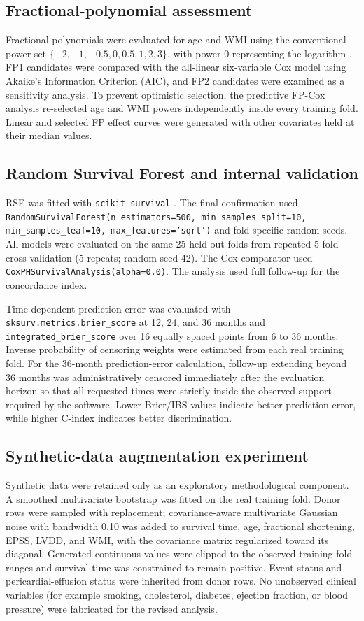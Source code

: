 \documentclass[a4paper,12pt]{article}
\begin{document}
\subsection{Fractional-polynomial assessment}
Fractional polynomials were evaluated for age and WMI using the conventional power set $\{-2,-1,-0.5,0,0.5,1,2,3\}$, with power 0 representing the logarithm \cite{ref10,ref36}. FP1 candidates were compared with the all-linear six-variable Cox model using Akaike's Information Criterion (AIC), and FP2 candidates were examined as a sensitivity analysis. To prevent optimistic selection, the predictive FP-Cox analysis re-selected age and WMI powers independently inside every training fold. Linear and selected FP effect curves were generated with other covariates held at their median values.

\subsection{Random Survival Forest and internal validation}
RSF was fitted with \texttt{scikit-survival} \cite{ref38,ref43}. The final confirmation used \texttt{RandomSurvivalForest(n\_estimators=500, min\_samples\_split=10, min\_samples\_leaf=10, max\_features='sqrt')} and fold-specific random seeds. All models were evaluated on the same 25 held-out folds from repeated 5-fold cross-validation (5 repeats; random seed 42). The Cox comparator used \texttt{CoxPHSurvivalAnalysis(alpha=0.0)}. The analysis used full follow-up for the concordance index.

Time-dependent prediction error was evaluated with \texttt{sksurv.metrics.brier\_score} at 12, 24, and 36 months and \texttt{integrated\_brier\_score} over 16 equally spaced points from 6 to 36 months. Inverse probability of censoring weights were estimated from each real training fold. For the 36-month prediction-error calculation, follow-up extending beyond 36 months was administratively censored immediately after the evaluation horizon so that all requested times were strictly inside the observed support required by the software. Lower Brier/IBS values indicate better prediction error, while higher C-index indicates better discrimination.

\subsection{Synthetic-data augmentation experiment}
Synthetic data were retained only as an exploratory methodological component. A smoothed multivariate bootstrap was fitted on the real training fold. Donor rows were sampled with replacement; covariance-aware multivariate Gaussian noise with bandwidth 0.10 was added to survival time, age, fractional shortening, EPSS, LVDD, and WMI, with the covariance matrix regularized toward its diagonal. Generated continuous values were clipped to the observed training-fold ranges and survival time was constrained to remain positive. Event status and pericardial-effusion status were inherited from donor rows. No unobserved clinical variables (for example smoking, cholesterol, diabetes, ejection fraction, or blood pressure) were fabricated for the revised analysis.
\end{document}
